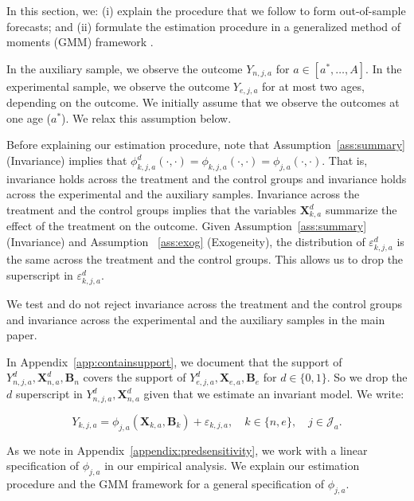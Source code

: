 \noindent In this section, we: (i) explain the procedure that we follow to form out-of-sample forecasts; and (ii) formulate the estimation procedure in a generalized method of moments (GMM) framework \citep{Hansen_1982_Econometrica}.

\noindent In the auxiliary sample, we observe the outcome $Y_{n,j,a}$ for $a \in [a^*, \ldots, A]$. In the experimental sample, we observe the outcome $Y_{e,j,a}$ for at most two ages, depending on the outcome. We initially assume that we observe the outcomes at one age ($a^*$). We relax this assumption below.

\noindent Before explaining our estimation procedure, note that Assumption~\ref{ass:summary} (Invariance) implies that $\phi_{k,j,a}^d \left (\cdot, \cdot \right) = \phi_{k,j,a}  \left (\cdot, \cdot \right) = \phi_{j,a}  \left (\cdot, \cdot \right)$. That is, invariance holds across the treatment and the control groups and invariance holds across the experimental and the auxiliary samples. Invariance across the treatment and the control groups implies that the variables $\bm{X}_{k,a}^d$ summarize the effect of the treatment on the outcome. Given Assumption~\ref{ass:summary} (Invariance)  and Assumption ~\ref{ass:exog} (Exogeneity), the distribution of $\varepsilon_{k,j,a}^d$ is the same across the treatment and the control groups. This allows us to drop the superscript in $\varepsilon_{k,j,a}^d$.

\noindent We test and do not reject invariance across the treatment and the control groups and invariance across the experimental and the auxiliary samples in the main paper.

\noindent In Appendix~\ref{app:containsupport}, we document that the support of $Y_{n,j,a}^d, \bm{X}_{n,a}^d, \bm{B}_{n}$ covers the support of $Y_{e,j,a}^d, \bm{X}_{e,a}, \bm{B}_{e}$ for $d \in \{0, 1\}$. So we drop the $d$ superscript in $Y_{n,j,a}^d, \bm{X}_{n,a}^d$ given that we estimate an invariant model. We write:

\begin{equation}\label{eq:routcome}
Y_{k,j,a} = \phi_{j,a} (\bm{X}_{k,a}, \bm{B}_k) + \varepsilon_{k,j,a}, \quad k \in \{n,e\}, \quad j \in \mathcal{J}_a.
\end{equation}

\noindent As we note in Appendix~\ref{appendix:predsensitivity}, we work with a linear specification of $\phi_{j,a}$ in our empirical analysis. We explain our estimation procedure and the GMM framework for a general specification of $\phi_{j,a}$.

